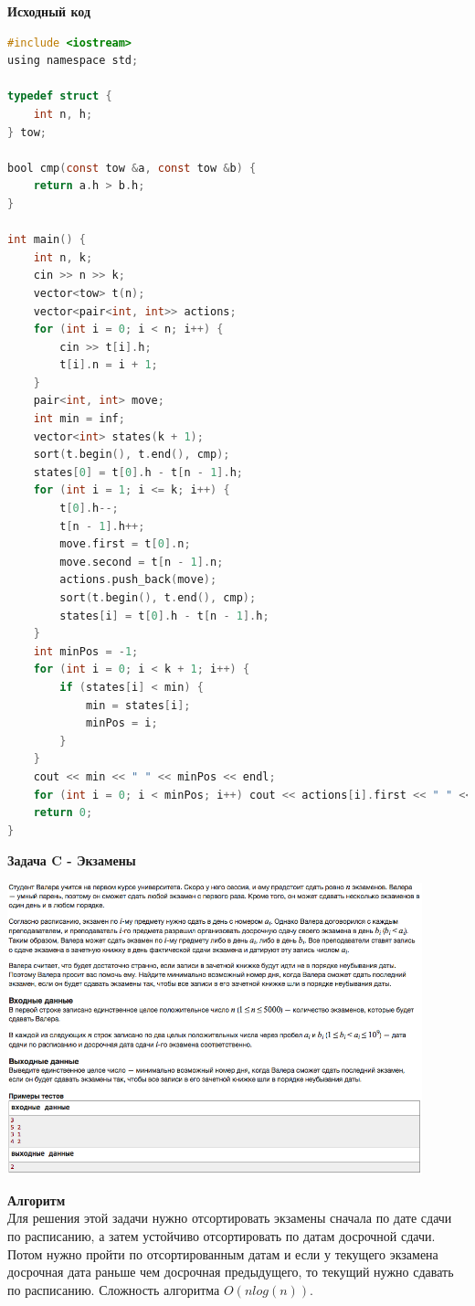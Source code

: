 \documentclass[a4paper,12pt]{article}
\begin{document}
\textbf{{\large Исходный код}}
\begin{lstlisting}[language=C]
#include <iostream>
using namespace std;

typedef struct {
    int n, h;
} tow;

bool cmp(const tow &a, const tow &b) {
    return a.h > b.h;
}

int main() {
    int n, k;
    cin >> n >> k;
    vector<tow> t(n);
    vector<pair<int, int>> actions;
    for (int i = 0; i < n; i++) {
        cin >> t[i].h;
        t[i].n = i + 1;
    }
    pair<int, int> move;
    int min = inf;
    vector<int> states(k + 1);
    sort(t.begin(), t.end(), cmp);
    states[0] = t[0].h - t[n - 1].h;
    for (int i = 1; i <= k; i++) {
        t[0].h--;
        t[n - 1].h++;
        move.first = t[0].n;
        move.second = t[n - 1].n;
        actions.push_back(move);
        sort(t.begin(), t.end(), cmp);
        states[i] = t[0].h - t[n - 1].h;
    }
    int minPos = -1;
    for (int i = 0; i < k + 1; i++) {
        if (states[i] < min) {
            min = states[i];
            minPos = i;
        }
    }
    cout << min << " " << minPos << endl;
    for (int i = 0; i < minPos; i++) cout << actions[i].first << " " << actions[i].second << endl;
    return 0;
}
\end{lstlisting}
\newpage
\textbf{{\large Задача C - Экзамены}} \\
\begin{center}
\includegraphics[width=0.9\textwidth]{C_274/C_274_C.png}\\ [1cm]
\end{center}
\textbf{{\large Алгоритм}} \\
Для решения этой задачи нужно отсортировать экзамены сначала по дате сдачи по расписанию, а затем устойчиво отсортировать по датам досрочной сдачи. Потом нужно пройти по отсортированным датам и если у текущего экзамена досрочная дата раньше чем досрочная предыдущего, то текущий нужно сдавать по расписанию. Сложность алгоритма $O(nlog(n))$.\\
\end{document}
